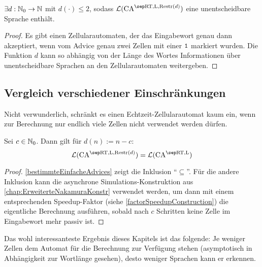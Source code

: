 \begin{satz}
    \label{einschraenkungUnentscheidbar}
    $\exists d: \mathbb{N}_0 \to \mathbb{N}$ mit $d(\cdot) \leq 2$, sodass $\CAL{\CART, \CALeft, \CARestr(d)}$ eine unentscheidbare Sprache enthält.
\end{satz}
\begin{proof}
    Es gibt einen Zellularautomaten, der das Eingabewort genau dann akzeptiert, wenn vom Advice genau zwei Zellen mit einer $\texttt{1}$ markiert wurden.
    Die Funktion $d$ kann so abhängig von der Länge des Wortes Informationen über unentscheidbare Sprachen an den Zellularautomaten weitergeben.
\end{proof}

\subsection{Vergleich verschiedener Einschränkungen}

Nicht verwunderlich, schränkt es einen Echtzeit-Zellularautomat kaum ein, wenn zur Berechnung nur endlich viele Zellen nicht verwendet werden dürfen.
\begin{satz}
    Sei $c \in \mathbb{N}_0$. Dann gilt für $d(n) := n - c$:
    \[
        \CAL{\CART, \CALeft, \CARestr(d)} = \CAL{\CART, \CALeft}
    \]
\end{satz}
\begin{proof}
    \cref{bestimmteEinfacheAdvices} zeigt die Inklusion \enquote{$\subseteq$}.
    Für die andere Inklusion kann die asynchrone Simulations-Konstruktion aus \cref{chap:ErweiterteNakamuraKonstr}
    verwendet werden, um dann mit einem entsprechenden Speedup-Faktor (siehe \cref{factorSpeedupConstruction})
    die eigentliche Berechnung ausführen, sobald nach $c$ Schritten keine Zelle im Eingabewort mehr passiv ist.
\end{proof}

Das wohl interessanteste Ergebnis dieses Kapitels ist das folgende: Je weniger Zellen dem Automat für die Berechnung zur
Verfügung stehen (asymptotisch in Abhängigkeit zur Wortlänge gesehen), desto weniger Sprachen kann er erkennen.

